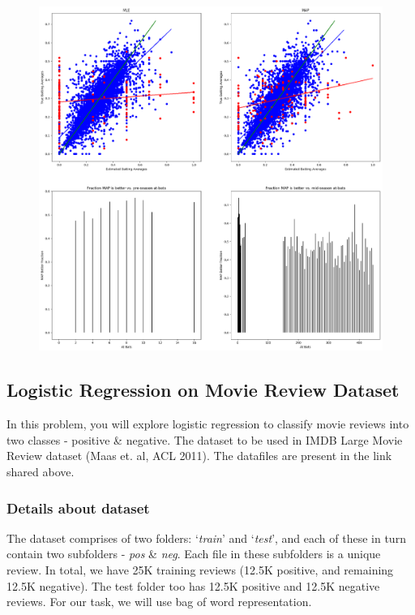 \documentclass{article}
\begin{document}
\begin{figure}[!h]
	\centering
	\includegraphics[width=15cm]{./Python/baseball_visualizations.png}
\end{figure}

\newpage
\subsection*{Logistic Regression on Movie Review Dataset}

In this problem, you will explore logistic regression to classify movie reviews into two classes - positive \& negative. The dataset to be used in IMDB Large Movie Review dataset (Maas et. al, ACL 2011). The datafiles are present in the link shared above.

\subsubsection*{Details about dataset}

The dataset comprises of two folders: `\textit{train}' and `\textit{test}', and each of these in turn contain two subfolders - \textit{pos} \& \textit{neg}. Each file in these subfolders is a unique review. In total, we have 25K training reviews (12.5K positive, and remaining 12.5K negative). The test folder too has 12.5K positive and 12.5K negative reviews. For our task, we will use bag of word representation.
\end{document}
